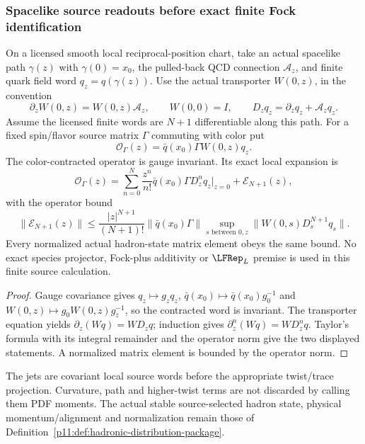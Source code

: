 \documentclass[12pt,a4paper]{article}
\begin{document}
\subsubsection{Spacelike source readouts before exact finite Fock identification}
\begin{theorem}
\label{p11:thm:v2210-lit-spacelike-source-jets}
On a licensed smooth local reciprocal-position chart, take an actual
spacelike path $\gamma(z)$ with $\gamma(0)=x_0$, the pulled-back QCD
connection $\mathcal A_z$, and finite quark field word $q_z=q(\gamma(z))$.
Use the actual transporter $W(0,z)$, in the convention
\[
 \partial_zW(0,z)=W(0,z)\mathcal A_z,\qquad W(0,0)=I,
 \qquad D_zq_z=\partial_zq_z+\mathcal A_zq_z.
\]
Assume the licensed finite words are $N+1$ differentiable along this path.
For a fixed spin/flavor source matrix $\Gamma$ commuting with color put
\[
 \mathcal O_\Gamma(z)=\bar q(x_0)\Gamma W(0,z)q_z.
\]
The color-contracted operator is gauge invariant. Its exact local expansion
is
\[
 \boxed{\mathcal O_\Gamma(z)
 =\sum_{n=0}^N\frac{z^n}{n!}
      \bar q(x_0)\Gamma D_z^nq_z|_{z=0}
    +\mathcal E_{N+1}(z),}
\]
with the operator bound
\[
 \boxed{\|\mathcal E_{N+1}(z)\|
 \le\frac{|z|^{N+1}}{(N+1)!}\|\bar q(x_0)\Gamma\|
       \sup_{s\text{ between }0,z}\|W(0,s)D_s^{N+1}q_s\|.}
\]
Every normalized actual hadron-state matrix element obeys the same bound.
No exact species projector, Fock-plus additivity or $\LFRep_L$ premise is
used in this finite source calculation.
\end{theorem}
\begin{proof}
Gauge covariance gives $q_z\mapsto g_zq_z$,
$\bar q(x_0)\mapsto\bar q(x_0)g_0^{-1}$ and
$W(0,z)\mapsto g_0W(0,z)g_z^{-1}$, so the contracted word is invariant.
The transporter equation yields
$\partial_z(Wq)=W D_zq$; induction gives
$\partial_z^n(Wq)=WD_z^nq$. Taylor's formula with its integral remainder
and the operator norm give the two displayed statements. A normalized
matrix element is bounded by the operator norm.
\end{proof}
The jets are covariant local source words before the appropriate
twist/trace projection. Curvature, path and higher-twist terms are not
discarded by calling them PDF moments. The actual stable source-selected
hadron state, physical momentum/alignment and normalization remain those of
Definition~\ref{p11:def:hadronic-distribution-package}.
\end{document}
